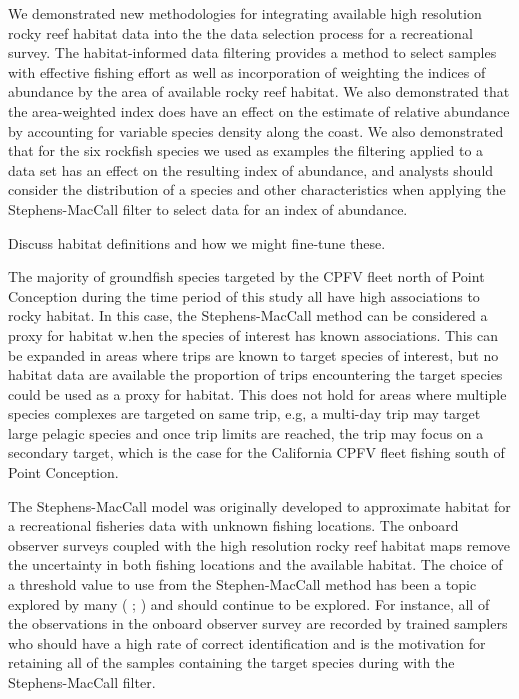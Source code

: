 \documentclass[
  12pt,
  authoryear,
  preprint,
  3p]{elsarticle}
\begin{document}
We demonstrated new methodologies for integrating available high
resolution rocky reef habitat data into the the data selection process
for a recreational survey. The habitat-informed data filtering provides
a method to select samples with effective fishing effort as well as
incorporation of weighting the indices of abundance by the area of
available rocky reef habitat. We also demonstrated that the
area-weighted index does have an effect on the estimate of relative
abundance by accounting for variable species density along the coast. We
also demonstrated that for the six rockfish species we used as examples
the filtering applied to a data set has an effect on the resulting index
of abundance, and analysts should consider the distribution of a species
and other characteristics when applying the Stephens-MacCall filter to
select data for an index of abundance.

Discuss habitat definitions and how we might fine-tune these.

The majority of groundfish species targeted by the CPFV fleet north of
Point Conception during the time period of this study all have high
associations to rocky habitat. In this case, the Stephens-MacCall method
can be considered a proxy for habitat w.hen the species of interest has
known associations. This can be expanded in areas where trips are known
to target species of interest, but no habitat data are available the
proportion of trips encountering the target species could be used as a
proxy for habitat. This does not hold for areas where multiple species
complexes are targeted on same trip, e.g, a multi-day trip may target
large pelagic species and once trip limits are reached, the trip may
focus on a secondary target, which is the case for the California CPFV
fleet fishing south of Point Conception.

The Stephens-MacCall model was originally developed to approximate
habitat for a recreational fisheries data with unknown fishing
locations. The onboard observer surveys coupled with the high resolution
rocky reef habitat maps remove the uncertainty in both fishing locations
and the available habitat. The choice of a threshold value to use from
the Stephen-MacCall method has been a topic explored by many
(\citet{DET:2021:ISA} ; ) and should continue to be explored. For
instance, all of the observations in the onboard observer survey are
recorded by trained samplers who should have a high rate of correct
identification and is the motivation for retaining all of the samples
containing the target species during with the Stephens-MacCall filter.
\end{document}
